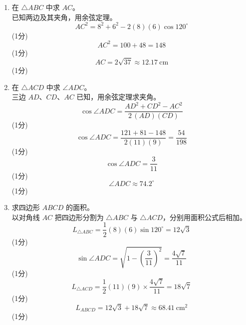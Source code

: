 \documentclass[12pt,a4paper]{exam-zh}
\begin{document}
\begin{solution}
    \begin{enumerate}[label=(\alph*)]
        \item 在 $\triangle ABC$ 中求 $AC$。 \\
        已知两边及其夹角，用余弦定理。 \\
        \[
            AC^2 = 8^2 + 6^2 - 2(8)(6)\cos 120^\circ
        \]
        \hfill (1分) \\
        \[
            AC^2 = 100 + 48 = 148
        \]
        \hfill (1分) \\
        \[
            AC = 2\sqrt{37} \approx 12.17 \ \mathrm{cm}
        \]
        \hfill (1分)

        \item 在 $\triangle ACD$ 中求 $\angle ADC$。 \\
        三边 $AD$、$CD$、$AC$ 已知，用余弦定理求夹角。 \\
        \[
            \cos \angle ADC = \frac{AD^2 + CD^2 - AC^2}{2\,(AD)(CD)}
        \]
        \hfill (1分) \\
        \[
            \cos \angle ADC = \frac{121 + 81 - 148}{2(11)(9)} = \frac{54}{198}
        \]
        \hfill (1分) \\
        \[
            \cos \angle ADC = \frac{3}{11}
        \]
        \hfill (1分) \\
        \[
            \angle ADC \approx 74.2^\circ
        \]
        \hfill (1分)

        \item 求四边形 $ABCD$ 的面积。 \\
        以对角线 $AC$ 把四边形分割为 $\triangle ABC$ 与 $\triangle ACD$，分别用面积公式后相加。 \\
        \[
            L_{\triangle ABC} = \frac{1}{2}(8)(6)\sin 120^\circ = 12\sqrt{3}
        \]
        \hfill (1分) \\
        \[
            \sin \angle ADC = \sqrt{1 - \left(\frac{3}{11}\right)^2} = \frac{4\sqrt{7}}{11}
        \]
        \hfill (1分) \\
        \[
            L_{\triangle ACD} = \frac{1}{2}(11)(9)\times \frac{4\sqrt{7}}{11} = 18\sqrt{7}
        \]
        \hfill (1分) \\
        \[
            L_{ABCD} = 12\sqrt{3} + 18\sqrt{7} \approx 68.41 \ \mathrm{cm}^2
        \]
        \hfill (1分)
    \end{enumerate}
\end{solution}
\end{document}
